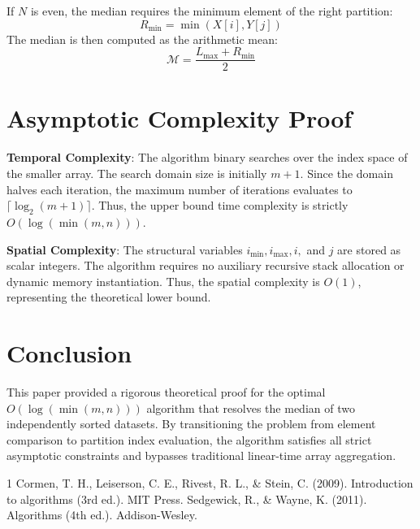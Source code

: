\documentclass[10pt,journal,compsoc]{IEEEtran}
\begin{document}
If $N$ is even, the median requires the minimum element of the right partition:
\begin{equation}
R_{\min} = \min(X[i], Y[j])
\end{equation}
The median is then computed as the arithmetic mean:
\begin{equation}
\mathcal{M} = \frac{L_{\max} + R_{\min}}{2}
\end{equation}

\section{Asymptotic Complexity Proof}
\textbf{Temporal Complexity}: The algorithm binary searches over the index space of the smaller array. The search domain size is initially $m+1$. Since the domain halves each iteration, the maximum number of iterations evaluates to $\lceil \log_2(m+1) \rceil$. Thus, the upper bound time complexity is strictly $O(\log(\min(m, n)))$. 

\textbf{Spatial Complexity}: The structural variables $i_{\min}, i_{\max}, i,$ and $j$ are stored as scalar integers. The algorithm requires no auxiliary recursive stack allocation or dynamic memory instantiation. Thus, the spatial complexity is $O(1)$, representing the theoretical lower bound.

\section{Conclusion}
This paper provided a rigorous theoretical proof for the optimal $O(\log(\min(m, n)))$ algorithm that resolves the median of two independently sorted datasets. By transitioning the problem from element comparison to partition index evaluation, the algorithm satisfies all strict asymptotic constraints and bypasses traditional linear-time array aggregation.

\begin{thebibliography}{1}
 Cormen, T. H., Leiserson, C. E., Rivest, R. L., \& Stein, C. (2009). Introduction to algorithms (3rd ed.). MIT Press.
 Sedgewick, R., \& Wayne, K. (2011). Algorithms (4th ed.). Addison-Wesley.
\end{thebibliography}
\end{document}

